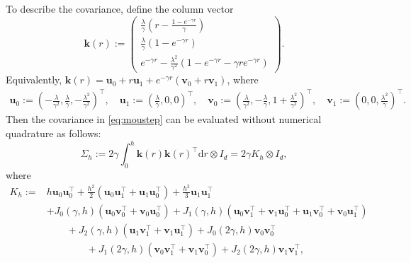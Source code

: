 \documentclass[11pt]{article}
\theoremstyle{definition}
\newcommand{\dd}{\mathrm d}
\newcommand{\Id}{I}
\begin{document}
To describe the covariance, define the column vector
\begin{equation}\label{eq:noisekernels}
\mathbf k(r):=
\begin{pmatrix}
 \displaystyle\frac{\lambda}{\gamma}
 \left(r-\frac{1-e^{-\gamma r}}{\gamma}\right)\\[5pt]
 \displaystyle\frac{\lambda}{\gamma}(1-e^{-\gamma r})\\[5pt]
 \displaystyle e^{-\gamma r}
 -\frac{\lambda^2}{\gamma^2}
  \left(1-e^{-\gamma r}-\gamma r e^{-\gamma r}\right)
\end{pmatrix}.
\end{equation}
Equivalently, $\mathbf k(r)=\mathbf u_0+r\mathbf u_1
+e^{-\gamma r}(\mathbf v_0+r\mathbf v_1)$, where
\begin{align*}
 \mathbf u_0:=\left(-\frac{\lambda}{\gamma^2},
                       \frac{\lambda}{\gamma},
                      -\frac{\lambda^2}{\gamma^2}\right)^\top,
 \quad\mathbf u_1:=\left(\frac{\lambda}{\gamma},0,0\right)^\top,
 \quad\mathbf v_0:=\left(\frac{\lambda}{\gamma^2},
                      -\frac{\lambda}{\gamma},
                       1+\frac{\lambda^2}{\gamma^2}\right)^\top,
 \quad\mathbf v_1:=\left(0,0,\frac{\lambda^2}{\gamma}\right)^\top.
\end{align*}
Then the covariance in \eqref{eq:moustep} can be evaluated without numerical
quadrature as follows: 
\begin{equation}\label{eq:explicitcovariance}
 \Sigma_h
 :=2\gamma\int_0^h\mathbf k(r)\mathbf k(r)^\top\dd r
   \otimes\Id_d
 =2\gamma K_h\otimes\Id_d,
\end{equation}
where
\begin{align*}
 K_h:=&h\mathbf u_0\mathbf u_0^\top
 +\frac{h^2}{2}\left(\mathbf u_0\mathbf u_1^\top
                      +\mathbf u_1\mathbf u_0^\top\right)
 +\frac{h^3}{3}\mathbf u_1\mathbf u_1^\top\\
 &+J_0(\gamma,h)\left(\mathbf u_0\mathbf v_0^\top
                      +\mathbf v_0\mathbf u_0^\top\right)+J_1(\gamma,h)\left(\mathbf u_0\mathbf v_1^\top
                      +\mathbf v_1\mathbf u_0^\top
                      +\mathbf u_1\mathbf v_0^\top
                      +\mathbf v_0\mathbf u_1^\top\right)\\
 &\qquad+J_2(\gamma,h)\left(\mathbf u_1\mathbf v_1^\top
                      +\mathbf v_1\mathbf u_1^\top\right)
 +J_0(2\gamma,h)\mathbf v_0\mathbf v_0^\top\\
 &\qquad\qquad+J_1(2\gamma,h)\left(\mathbf v_0\mathbf v_1^\top
                       +\mathbf v_1\mathbf v_0^\top\right)
 +J_2(2\gamma,h)\mathbf v_1\mathbf v_1^\top,
\end{align*}
\end{document}
